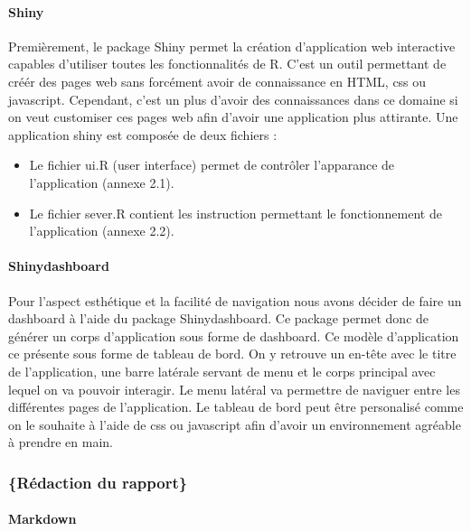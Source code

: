 \documentclass[
  12pt,
]{article}
\begin{document}
\hypertarget{shiny}{%
\paragraph{Shiny}\label{shiny}}

Premièrement, le package Shiny permet la création d'application web
interactive capables d'utiliser toutes les fonctionnalités de R. C'est
un outil permettant de créér des pages web sans forcément avoir de
connaissance en HTML, css ou javascript. Cependant, c'est un plus
d'avoir des connaissances dans ce domaine si on veut customiser ces
pages web afin d'avoir une application plus attirante. Une application
shiny est composée de deux fichiers :

\begin{itemize}
\item Le fichier ui.R (user interface) permet de contrôler l'apparance de l'application (annexe 2.1).
\item Le fichier sever.R contient les instruction permettant le fonctionnement de l'application (annexe 2.2).
\end{itemize}

\hypertarget{shinydashboard}{%
\paragraph{Shinydashboard}\label{shinydashboard}}

Pour l'aspect esthétique et la facilité de navigation nous avons décider
de faire un dashboard à l'aide du package Shinydashboard. Ce package
permet donc de générer un corps d'application sous forme de dashboard.
Ce modèle d'application ce présente sous forme de tableau de bord. On y
retrouve un en-tête avec le titre de l'application, une barre latérale
servant de menu et le corps principal avec lequel on va pouvoir
interagir. Le menu latéral va permettre de naviguer entre les
différentes pages de l'application. Le tableau de bord peut être
personalisé comme on le souhaite à l'aide de css ou javascript afin
d'avoir un environnement agréable à prendre en main.

\hypertarget{ruxe9daction-du-rapport}{%
\subsubsection{\texorpdfstring{\normalsize\{Rédaction du
rapport\}}{\{Rédaction du rapport\}}}\label{ruxe9daction-du-rapport}}

\hypertarget{markdown}{%
\paragraph{Markdown}\label{markdown}}
\end{document}
